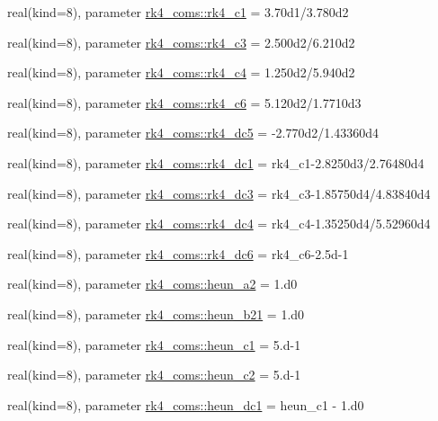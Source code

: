 \begin{DoxyCompactItemize}
real(kind=8), parameter \hyperlink{namespacerk4__coms_a1dd142bdfa35986937ac4396a759dda0}{rk4\+\_\+coms\+::rk4\+\_\+c1} = 3.\+70d1/3.\+780d2
\item 
real(kind=8), parameter \hyperlink{namespacerk4__coms_a94a604a5d0d271bf875f0fd3338fef3e}{rk4\+\_\+coms\+::rk4\+\_\+c3} = 2.\+500d2/6.\+210d2
\item 
real(kind=8), parameter \hyperlink{namespacerk4__coms_ae29e60a0912723f4124b219bb67135d8}{rk4\+\_\+coms\+::rk4\+\_\+c4} = 1.\+250d2/5.\+940d2
\item 
real(kind=8), parameter \hyperlink{namespacerk4__coms_a50aa680b806d041ad4b2d83b838ce6e4}{rk4\+\_\+coms\+::rk4\+\_\+c6} = 5.\+120d2/1.\+7710d3
\item 
real(kind=8), parameter \hyperlink{namespacerk4__coms_aa2ab2d5fa0e976ca56e10da08c4409a6}{rk4\+\_\+coms\+::rk4\+\_\+dc5} = -\/2.\+770d2/1.\+43360d4
\item 
real(kind=8), parameter \hyperlink{namespacerk4__coms_a8f2ecc1ddfd20579092c340f3cde39b4}{rk4\+\_\+coms\+::rk4\+\_\+dc1} = rk4\+\_\+c1-\/2.\+8250d3/2.\+76480d4
\item 
real(kind=8), parameter \hyperlink{namespacerk4__coms_ad50fbfa221dd0da30f0c1f4bbc5d4f3e}{rk4\+\_\+coms\+::rk4\+\_\+dc3} = rk4\+\_\+c3-\/1.\+85750d4/4.\+83840d4
\item 
real(kind=8), parameter \hyperlink{namespacerk4__coms_a1bb5b9bcaddfd294bf37a8ea838adf3f}{rk4\+\_\+coms\+::rk4\+\_\+dc4} = rk4\+\_\+c4-\/1.\+35250d4/5.\+52960d4
\item 
real(kind=8), parameter \hyperlink{namespacerk4__coms_abf3a30685db4e4c9f6cd9f903eb1a2fd}{rk4\+\_\+coms\+::rk4\+\_\+dc6} = rk4\+\_\+c6-\/2.\+5d-\/1
\item 
real(kind=8), parameter \hyperlink{namespacerk4__coms_a87d69315c8ce5a8eece7631c044e56e5}{rk4\+\_\+coms\+::heun\+\_\+a2} = 1.d0
\item 
real(kind=8), parameter \hyperlink{namespacerk4__coms_ae8d76c010784094c3299f39f54d015c1}{rk4\+\_\+coms\+::heun\+\_\+b21} = 1.d0
\item 
real(kind=8), parameter \hyperlink{namespacerk4__coms_aacfe35ff98522754e71ad11a44b521b4}{rk4\+\_\+coms\+::heun\+\_\+c1} = 5.d-\/1
\item 
real(kind=8), parameter \hyperlink{namespacerk4__coms_afad602ec1632d28447fa784393dd4777}{rk4\+\_\+coms\+::heun\+\_\+c2} = 5.d-\/1
\item 
real(kind=8), parameter \hyperlink{namespacerk4__coms_aeea9fe3a451738a304eacef0dfa174a1}{rk4\+\_\+coms\+::heun\+\_\+dc1} = heun\+\_\+c1 -\/ 1.d0

\end{DoxyCompactItemize}
